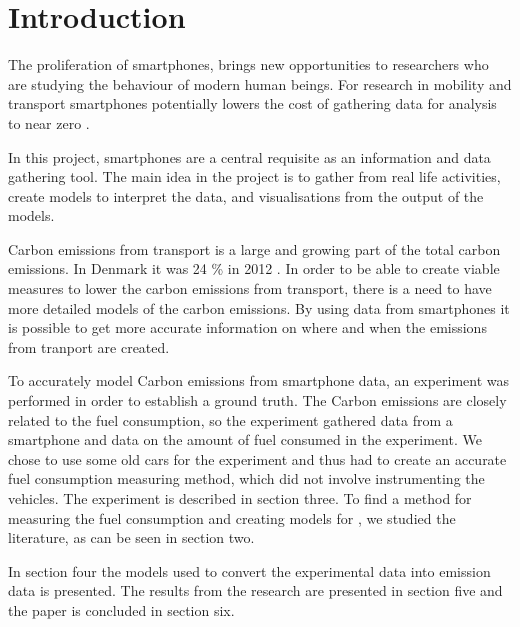 \section{Introduction}

The proliferation of smartphones, brings new opportunities to researchers who are studying the behaviour of modern human beings. For research in mobility and transport smartphones potentially lowers the cost of gathering data for analysis to near zero \cite{Liu2013}.

In this project, smartphones are a central requisite as an information and data gathering tool. The main idea in the project is to gather from real life activities, create models to interpret the data, and visualisations from the output of the models. 

Carbon emissions from transport is a large and growing part of the total carbon emissions. In Denmark it was 24 \% in 2012 \cite{nielsen2014}. In order to be able to create viable measures to lower the carbon emissions from transport, there is a need to have more detailed models of the carbon emissions. By using data from smartphones it is possible to get more accurate information on where and when the emissions from tranport are created. 

To accurately model Carbon emissions from smartphone data, an experiment was performed in order to establish a ground truth. The Carbon emissions are closely related to the fuel consumption, so the experiment gathered data from a smartphone and data on the amount of fuel consumed in the experiment. We chose to use some old cars for the experiment and thus had to create an accurate fuel consumption measuring method, which did not involve instrumenting the vehicles. The experiment is described  in section three. To find a method for measuring the fuel consumption and creating models for , we studied the literature, as can be seen in section two.

In section four the models used to convert the experimental data into emission data is presented. The results from the research are presented in section five and the paper is concluded in section six.
